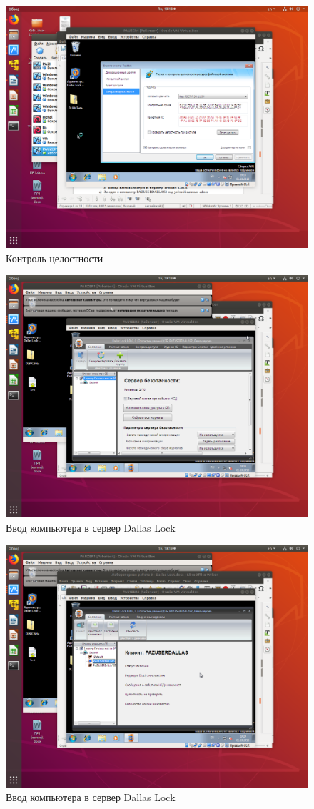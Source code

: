 \begin{figure}[H]
	\centering
	\includegraphics[width=.8\textwidth]{images/14.png}
	\caption{Контроль целостности}
\end{figure}

\begin{figure}[H]
	\centering
	\includegraphics[width=.8\textwidth]{images/15.png}
	\caption{Ввод компьютера в сервер Dallas Lock}
\end{figure}

\begin{figure}[H]
	\centering
	\includegraphics[width=.8\textwidth]{images/16.png}
	\caption{Ввод компьютера в сервер Dallas Lock}
\end{figure}

